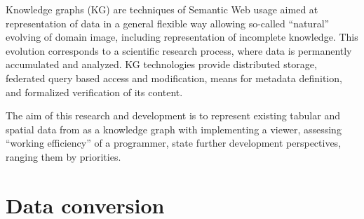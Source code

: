 \documentclass[
]{ceurart}
\begin{document}
Knowledge graphs (KG) \cite{hogan} are techniques of Semantic Web usage aimed at representation of data in a general flexible way allowing so-called ``natural'' evolving of domain image, including representation of incomplete knowledge.  This evolution corresponds to a scientific research process, where data is permanently accumulated and analyzed.  KG technologies provide distributed storage, federated query based access and modification, means for metadata definition, and formalized verification of its content.

The aim of this research and development is to represent existing tabular and spatial data from \cite{lunina,afs} as a knowledge graph with implementing a viewer, assessing ``working efficiency'' of a programmer, state further development perspectives, ranging them by priorities.

\section{Data conversion}
\end{document}
